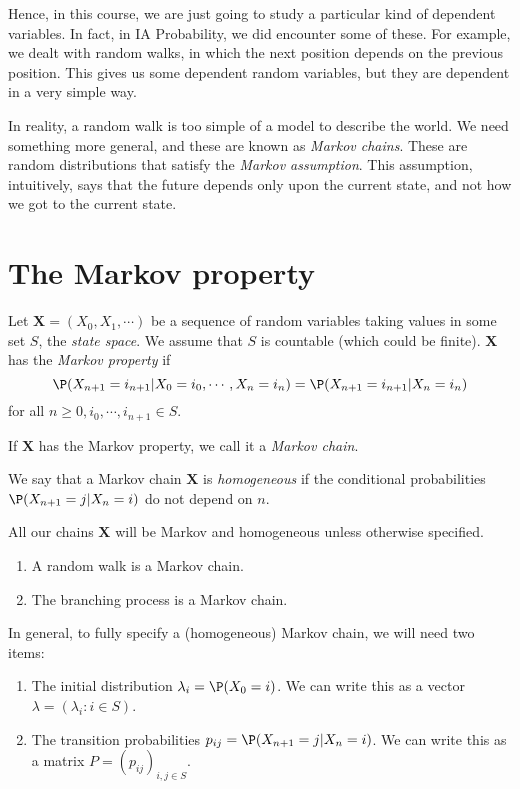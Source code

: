\documentclass[a4paper]{article}
\begin{document}
Hence, in this course, we are just going to study a particular kind of dependent variables. In fact, in IA Probability, we did encounter some of these. For example, we dealt with random walks, in which the next position depends on the previous position. This gives us some dependent random variables, but they are dependent in a very simple way.

In reality, a random walk is too simple of a model to describe the world. We need something more general, and these are known as \emph{Markov chains}. These are random distributions that satisfy the \emph{Markov assumption}. This assumption, intuitively, says that the future depends only upon the current state, and not how we got to the current state.

\section{The Markov property}
\begin{defi}
  Let $\mathbf{X} = (X_0, X_1, \cdots)$ be a sequence of random variables taking values in some set $S$, the \emph{state space}. We assume that $S$ is countable (which could be finite). $\mathbf{X}$ has the \emph{Markov property} if
  \[
    \P(X_{n + 1} = i_{n + 1} | X_0 = i_0, \cdots, X_n = i_n) = \P(X_{n + 1} = i_{n + 1} | X_n = i_n)
  \]
  for all $n\geq 0, i_0,\cdots, i_{n + 1}\in S$.

  If $\mathbf{X}$ has the Markov property, we call it a \emph{Markov chain}.

  We say that a Markov chain $\mathbf{X}$ is \emph{homogeneous} if the conditional probabilities $\P(X_{n + 1} = j | X_n = i)$ do not depend on $n$.
\end{defi}
All our chains $\mathbf{X}$ will be Markov and homogeneous unless otherwise specified.

\begin{eg}\leavevmode
  \begin{enumerate}
    \item A random walk is a Markov chain.
    \item The branching process is a Markov chain.
  \end{enumerate}
\end{eg}

In general, to fully specify a (homogeneous) Markov chain, we will need two items:
\begin{enumerate}
  \item The initial distribution $\lambda_i = \P(X_0 = i)$. We can write this as a vector $\lambda = (\lambda_i: i \in S)$.
  \item The transition probabilities $p_{ij} = \P(X_{n + 1} = j | X_n = i)$. We can write this as a matrix $P = (p_{ij})_{i, j\in S}$.
\end{enumerate}
\end{document}
